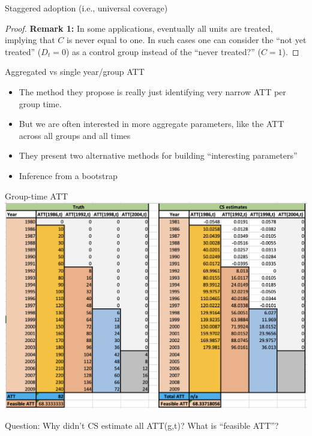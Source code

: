 \documentclass{beamer}
\begin{document}
\begin{frame}{Staggered adoption (i.e., universal coverage)}


\begin{proof}{\textbf{Remark 1:}}
In some applications, eventually all units are treated, implying that $C$ is never equal to one. In such cases one can consider the ``not yet treated'' ($D_t = 0$) as a control group instead of
the ``never treated?'' ($C = 1$).
\end{proof}

\end{frame}

\begin{frame}{Aggregated vs single year/group ATT}

\begin{itemize}
\item The method they propose is really just identifying very narrow ATT per group time.
\item But we are often interested in  more aggregate parameters, like the ATT across all groups and all times
\item They present two alternative methods for building ``interesting parameters'' 
\item Inference from a bootstrap
\end{itemize}


\end{frame}



\begin{frame}{Group-time ATT }
             \includegraphics[scale=0.45]{./lecture_includes/baker_attgt_cs}

Question: Why didn't CS estimate all ATT(g,t)? What is ``feasible ATT''?

\end{frame}
\end{document}

